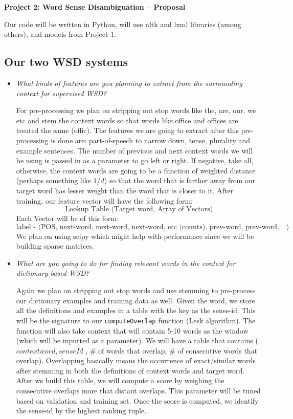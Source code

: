 \documentclass{article}
\begin{document}
\begin{center}\textbf{Project 2: Word Sense Disambiguation -- Proposal}\end{center}

Our code will be written in Python, will use nltk and lxml libraries (among others), and models from Project 1.

\subsection*{Our two WSD systems}

\begin{itemize}
\item \textit{What kinds of features are you planning to extract from the surrounding context for supervised WSD?}\par

For pre-processing we plan on stripping out stop words like the, are, our, we etc and stem the context words so that words like office and offices are treated the same (offic). The features we are going to extract after this pre-processing is done are: part-of-speech to narrow down, tense, plurality and example sentences. The number of previous and next context words we will be using is passed in as a parameter to go left or right. If negative, take all, otherwise, the context words are going to be a function of weighted distance (perhaps something like $1/d$) so that the word that is farther away from our target word has lesser weight than the word that is closer to it. After training, our feature vector will have the following form:
\[\text{Lookup Table (Target word, Array of Vectors)}\]
Each Vector will be of this form:
\[\text{label - $\langle$POS, next-word, next-word, next-word, etc (counts), prev-word, prev-word, etc (counts)$\rangle$}\]
We plan on using scipy which might help with performance since we will be building sparse matrices.

\item \textit{What are you going to do for finding relevant words in the context for
dictionary-based WSD?}\par

Again we plan on stripping out stop words and use stemming to pre-process our dictionary examples and training data as well. Given the word, we store all the definitions and examples in a table with the key as the sense-id. This will be the signature to our \texttt{computeOverlap} function (Lesk algorithm). The function will also take context that will contain 5-10 words as the window (which will be inputted as a parameter). We will have a table that contains (\(contextword, senseId\) , \# of words that overlap, \# of consecutive words that overlap). Overlapping basically means the occurrence of exact/similar words after stemming in both the definitions of context words and target word. After we build this table, we will compute a score by weighing the consecutive overlaps more that distant overlaps. This parameter will be tuned based on validation and training set. Once the score is computed, we identify the sense-id by the highest ranking tuple.


\end{itemize}
\end{document}
